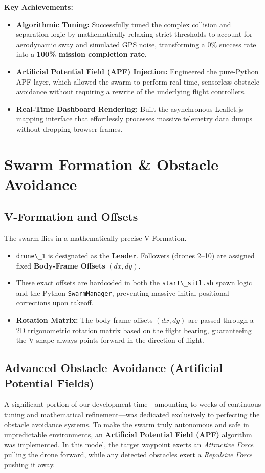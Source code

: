 \documentclass[11pt,a4paper]{article}
\newcommand{\code}[1]{\lstinline[basicstyle=\ttfamily\small,columns=fullflexible]|#1|}
\begin{document}
\textbf{Key Achievements:}
\begin{itemize}[leftmargin=1.5em]
    \item \textbf{Algorithmic Tuning:} Successfully tuned the complex collision and separation logic by mathematically relaxing strict thresholds to account for aerodynamic sway and simulated GPS noise, transforming a 0\% success rate into a \textbf{100\% mission completion rate}.
    \item \textbf{Artificial Potential Field (APF) Injection:} Engineered the pure-Python APF layer, which allowed the swarm to perform real-time, sensorless obstacle avoidance without requiring a rewrite of the underlying flight controllers.
    \item \textbf{Real-Time Dashboard Rendering:} Built the asynchronous Leaflet.js mapping interface that effortlessly processes massive telemetry data dumps without dropping browser frames.
\end{itemize}

\section{Swarm Formation \& Obstacle Avoidance}

\subsection{V-Formation and Offsets}
The swarm flies in a mathematically precise V-Formation.
\begin{itemize}[leftmargin=1.5em]
    \item \code{drone\_1} is designated as the \textbf{Leader}. Followers (drones 2--10) are assigned fixed \textbf{Body-Frame Offsets} $(dx, dy)$.
    \item These exact offsets are hardcoded in both the \code{start\_sitl.sh} spawn logic and the Python \code{SwarmManager}, preventing massive initial positional corrections upon takeoff.
    \item \textbf{Rotation Matrix:} The body-frame offsets $(dx, dy)$ are passed through a 2D trigonometric rotation matrix based on the flight bearing, guaranteeing the V-shape always points forward in the direction of flight.
\end{itemize}

\subsection{Advanced Obstacle Avoidance (Artificial Potential Fields)}
A significant portion of our development time---amounting to weeks of continuous tuning and mathematical refinement---was dedicated exclusively to perfecting the obstacle avoidance systems. To make the swarm truly autonomous and safe in unpredictable environments, an \textbf{Artificial Potential Field (APF)} algorithm was implemented. In this model, the target waypoint exerts an \textit{Attractive Force} pulling the drone forward, while any detected obstacles exert a \textit{Repulsive Force} pushing it away. 
\end{document}
